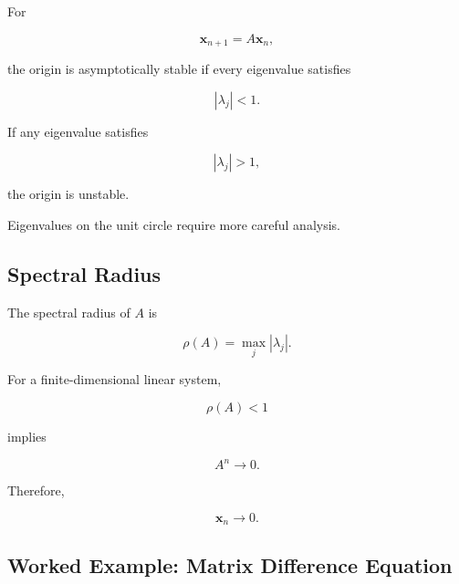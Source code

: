 For

\[
\mathbf{x}_{n+1}=A\mathbf{x}_n,
\]

the origin is asymptotically stable if every eigenvalue satisfies

\[
\boxed{
|\lambda_j|<1.
}
\]

If any eigenvalue satisfies

\[
\boxed{
|\lambda_j|>1,
}
\]

the origin is unstable.

Eigenvalues on the unit circle require more careful analysis.

\subsection{Spectral Radius}
\label{subsec:discrete-spectral-radius}

The spectral radius of \(A\) is

\[
\boxed{
\rho(A)
=
\max_j
|\lambda_j|.
}
\]

For a finite-dimensional linear system,

\[
\boxed{
\rho(A)<1
}
\]

implies

\[
A^n\to0.
\]

Therefore,

\[
\boxed{
\mathbf{x}_n\to0.
}
\]

\subsection{Worked Example: Matrix Difference Equation}
\label{subsec:worked-matrix-difference-equation}


